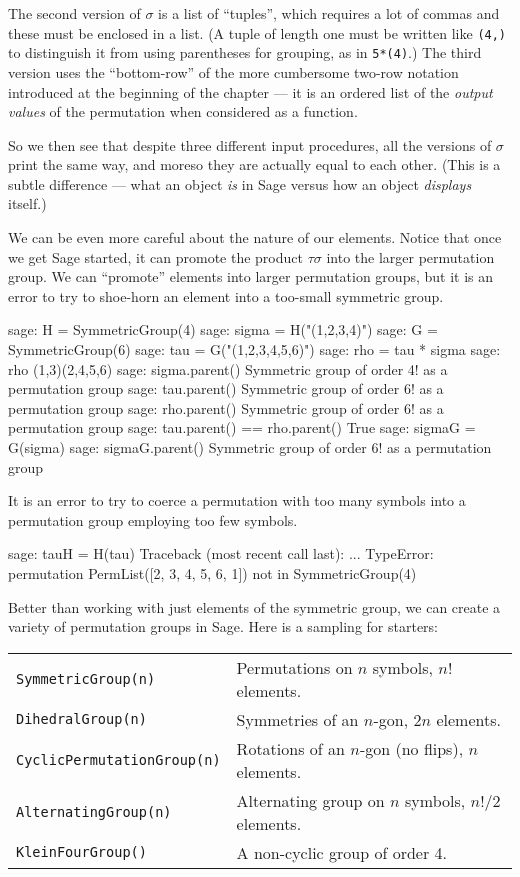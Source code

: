 %
The second version of $\sigma$ is a list of ``tuples'', which requires a lot of commas and these must be enclosed in a list.  (A tuple of length one must be written like \verb?(4,)? to distinguish it from using parentheses for grouping, as in \verb?5*(4)?.)  The third version uses the ``bottom-row'' of the more cumbersome two-row notation introduced at the beginning of the chapter --- it is an ordered list of the \emph{output values} of the permutation when considered as a function.\par
%
So we then see that despite three different input procedures, all the versions of $\sigma$ print the same way, and moreso they are actually equal to each other.  (This is a subtle difference --- what an object \emph{is} in Sage versus how an object \emph{displays} itself.)\par
%
We can be even more careful about the nature of our elements.  Notice that once we get Sage started, it can promote the product $\tau\sigma$ into the larger permutation group.  We can ``promote'' elements into larger permutation groups, but it is an error to try to shoe-horn an element into a too-small symmetric group.
%
\begin{sageexample}
sage: H = SymmetricGroup(4)
sage: sigma = H("(1,2,3,4)")
sage: G = SymmetricGroup(6)
sage: tau = G("(1,2,3,4,5,6)")
sage: rho = tau * sigma
sage: rho
(1,3)(2,4,5,6)
sage: sigma.parent()
Symmetric group of order 4! as a permutation group
sage: tau.parent()
Symmetric group of order 6! as a permutation group
sage: rho.parent()
Symmetric group of order 6! as a permutation group
sage: tau.parent() == rho.parent()
True
sage: sigmaG = G(sigma)
sage: sigmaG.parent()
Symmetric group of order 6! as a permutation group
\end{sageexample}
%
It is an error to try to coerce a permutation with too many symbols into a permutation group employing too few symbols.
%
\begin{sageexample}
sage: tauH = H(tau)
Traceback (most recent call last):
...
TypeError: permutation PermList([2, 3, 4, 5, 6, 1]) not in SymmetricGroup(4)
\end{sageexample}
%
Better than working with just elements of the symmetric group, we can create a variety of permutation groups in Sage.  Here is a sampling for starters:
%
\begin{center}
\begin{tabular}{ll}
\verb?SymmetricGroup(n)?         & Permutations on $n$ symbols, $n!$ elements.\\
\verb?DihedralGroup(n)?          & Symmetries of an $n$-gon, $2n$ elements.\\
\verb?CyclicPermutationGroup(n)? & Rotations of an $n$-gon (no flips), $n$ elements.\\
\verb?AlternatingGroup(n)?       & Alternating group on $n$ symbols, $n!/2$ elements.\\
\verb?KleinFourGroup()?          & A non-cyclic group of order 4.
\end{tabular}
\end{center}
